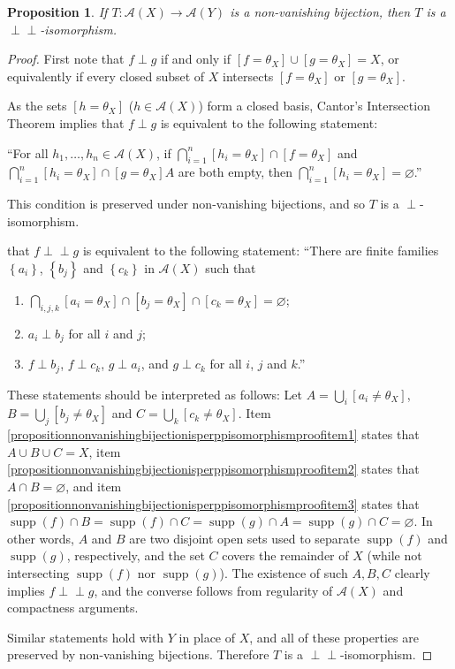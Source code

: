 \documentclass[letter,11pt]{amsart}
\theoremstyle{plain}		\newtheorem{theorem}[generalnumbering]{Theorem}
\theoremstyle{plain}		\newtheorem{corollary}[generalnumbering]{Corollary}
\theoremstyle{definition}		\newtheorem{definition}[generalnumbering]{Definition}
\theoremstyle{definition}		\newtheorem{example}[generalnumbering]{Example}
\theoremstyle{plain}		\newtheorem{proposition}[generalnumbering]{Proposition}
\theoremstyle{plain}		\newtheorem{lemma}[generalnumbering]{Lemma}
\theoremstyle{definition}
\newcommand{\perpp}{\perp\!\!\!\perp}
\DeclareMathOperator{\supp}{supp}
\begin{document}
\begin{proposition}\label{propositionnonvanishingbijectionisperppisomorphism}
	If $T\colon\mathcal{A}(X)\to\mathcal{A}(Y)$ is a non-vanishing bijection, then $T$ is a $\perpp$-isomorphism.
\end{proposition}
\begin{proof}
	First note that $f\perp g$ if and only if $[f=\theta_X]\cup[g=\theta_X]=X$, or equivalently if every closed subset of $X$ intersects $[f=\theta_X]$ or $[g=\theta_X]$.
	
	As the sets $[h=\theta_X]$ ($h\in\mathcal{A}(X)$) form a closed basis, Cantor's Intersection Theorem implies that $f\perp g$ is equivalent to the following statement:
	\begin{center}
		``For all $h_1,\ldots,h_n\in\mathcal{A}(X)$, if $\bigcap_{i=1}^n[h_i=\theta_X]\cap[f=\theta_X]$ and $\bigcap_{i=1}^n[h_i=\theta_X]\cap[g=\theta_X]A$ are both empty, then $\bigcap_{i=1}^n[h_i=\theta_X]=\varnothing$.''
	\end{center}
	This condition is preserved under non-vanishing bijections, and so $T$ is a $\perp$-isomorphism.
	
	that $f\perpp g$ is equivalent to the following statement: ``There are finite families $\left\{a_i\right\}$, $\left\{b_j\right\}$ and $\left\{c_k\right\}$ in $\mathcal{A}(X)$ such that
	\begin{enumerate}[label=(\roman*)]
		\item\label{propositionnonvanishingbijectionisperppisomorphismproofitem1} $\bigcap_{i,j,k}[a_i=\theta_X]\cap[b_j=\theta_X]\cap[c_k=\theta_X]=\varnothing$;
		\item\label{propositionnonvanishingbijectionisperppisomorphismproofitem2} $a_i\perp b_j$ for all $i$ and $j$;
		\item\label{propositionnonvanishingbijectionisperppisomorphismproofitem3} $f\perp b_j$, $f\perp c_k$, $g\perp a_i$, and $g\perp c_k$ for all $i$, $j$ and $k$.''
	\end{enumerate}
	
	These statements should be interpreted as follows: Let $A=\bigcup_i[a_i\neq\theta_X]$, $B=\bigcup_j[b_j\neq\theta_X]$ and $C=\bigcup_k[c_k\neq\theta_X]$. Item \ref{propositionnonvanishingbijectionisperppisomorphismproofitem1} states that $A\cup B\cup C=X$, item \ref{propositionnonvanishingbijectionisperppisomorphismproofitem2} states that $A\cap B=\varnothing$, and item \ref{propositionnonvanishingbijectionisperppisomorphismproofitem3} states that $\supp(f)\cap B=\supp(f)\cap C=\supp(g)\cap A=\supp(g)\cap C=\varnothing$.
	In other words, $A$ and $B$ are two disjoint open sets used to separate $\supp(f)$ and $\supp(g)$, respectively, and the set $C$ covers the remainder of $X$ (while not intersecting $\supp(f)$ nor $\supp(g)$). The existence of such $A,B,C$ clearly implies $f\perpp g$, and the converse follows from regularity of $\mathcal{A}(X)$ and compactness arguments.
	
	Similar statements hold with $Y$ in place of $X$, and all of these properties are preserved by non-vanishing bijections. Therefore $T$ is a $\perpp$-isomorphism.
\end{proof}
\end{document}
